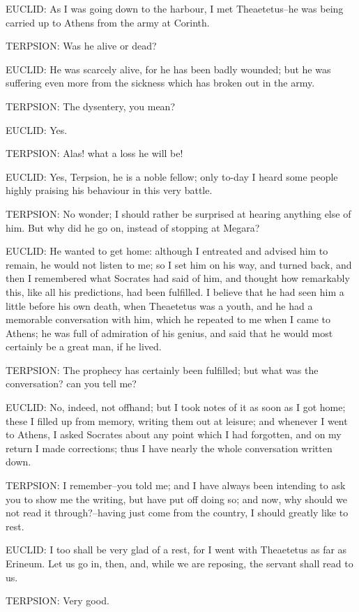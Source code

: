EUCLID: As I was going down to the harbour, I met Theaetetus--he was
being carried up to Athens from the army at Corinth.

TERPSION: Was he alive or dead?

EUCLID: He was scarcely alive, for he has been badly wounded; but he was
suffering even more from the sickness which has broken out in the army.

TERPSION: The dysentery, you mean?

EUCLID: Yes.

TERPSION: Alas! what a loss he will be!

EUCLID: Yes, Terpsion, he is a noble fellow; only to-day I heard some
people highly praising his behaviour in this very battle.

TERPSION: No wonder; I should rather be surprised at hearing anything
else of him. But why did he go on, instead of stopping at Megara?

EUCLID: He wanted to get home: although I entreated and advised him to
remain, he would not listen to me; so I set him on his way, and turned
back, and then I remembered what Socrates had said of him, and thought
how remarkably this, like all his predictions, had been fulfilled.
I believe that he had seen him a little before his own death, when
Theaetetus was a youth, and he had a memorable conversation with him,
which he repeated to me when I came to Athens; he was full of admiration
of his genius, and said that he would most certainly be a great man, if
he lived.

TERPSION: The prophecy has certainly been fulfilled; but what was the
conversation? can you tell me?

EUCLID: No, indeed, not offhand; but I took notes of it as soon as I got
home; these I filled up from memory, writing them out at leisure; and
whenever I went to Athens, I asked Socrates about any point which I had
forgotten, and on my return I made corrections; thus I have nearly the
whole conversation written down.

TERPSION: I remember--you told me; and I have always been intending to
ask you to show me the writing, but have put off doing so; and now, why
should we not read it through?--having just come from the country, I
should greatly like to rest.

EUCLID: I too shall be very glad of a rest, for I went with Theaetetus
as far as Erineum. Let us go in, then, and, while we are reposing, the
servant shall read to us.

TERPSION: Very good.

